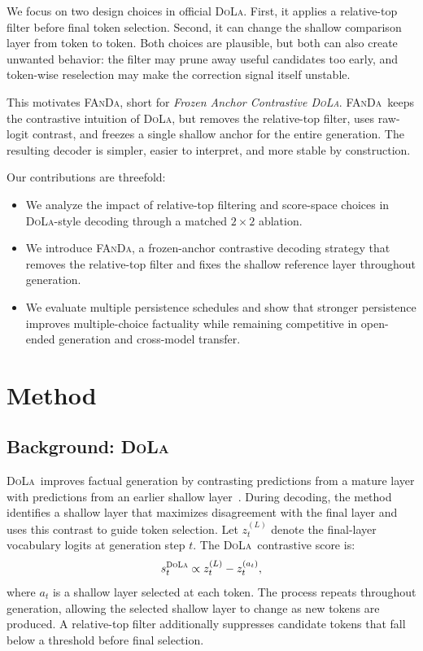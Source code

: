 \documentclass[10pt,twocolumn,letterpaper]{article}
\newcommand{\fanda}{\textsc{FAnDa}}
\newcommand{\dola}{\textsc{DoLa}}
\begin{document}
We focus on two design choices in official \dola. First, it applies a relative-top filter before final token selection. Second, it can change the shallow comparison layer from token to token. Both choices are plausible, but both can also create unwanted behavior: the filter may prune away useful candidates too early, and token-wise reselection may make the correction signal itself unstable.

This motivates \fanda, short for \emph{Frozen Anchor Contrastive \dola}. \fanda\ keeps the contrastive intuition of \dola, but removes the relative-top filter, uses raw-logit contrast, and freezes a single shallow anchor for the entire generation. The resulting decoder is simpler, easier to interpret, and more stable by construction.

Our contributions are threefold:
\begin{itemize}
  \setlength{\itemsep}{1pt}
  \setlength{\parsep}{0pt}
  \item We analyze the impact of relative-top filtering and score-space choices in \dola-style decoding through a matched $2\times 2$ ablation.
  \item We introduce \fanda, a frozen-anchor contrastive decoding strategy that removes the relative-top filter and fixes the shallow reference layer throughout generation.
  \item We evaluate multiple persistence schedules and show that stronger persistence improves multiple-choice factuality while remaining competitive in open-ended generation and cross-model transfer.
\end{itemize}

\section{Method}

\subsection{Background: \dola}
\dola\ improves factual generation by contrasting predictions from a mature layer with predictions from an earlier shallow layer~\cite{dola}. During decoding, the method identifies a shallow layer that maximizes disagreement with the final layer and uses this contrast to guide token selection. Let $z_t^{(L)}$ denote the final-layer vocabulary logits at generation step $t$. The \dola\ contrastive score is:
\[
s_t^{\text{\dola}} \propto z_t^{(L)} - z_t^{(a_t)},
\]
where $a_t$ is a shallow layer selected at each token. The process repeats throughout generation, allowing the selected shallow layer to change as new tokens are produced. A relative-top filter additionally suppresses candidate tokens that fall below a threshold before final selection.
\end{document}
